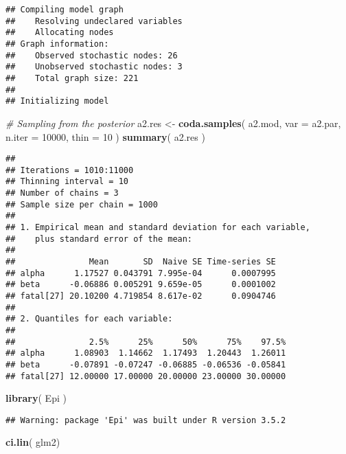 \documentclass[]{article}
\newenvironment{Shaded}{\begin{snugshade}}{\end{snugshade}}
\newcommand{\KeywordTok}[1]{\textcolor[rgb]{0.13,0.29,0.53}{\textbf{#1}}}
\newcommand{\DataTypeTok}[1]{\textcolor[rgb]{0.13,0.29,0.53}{#1}}
\newcommand{\DecValTok}[1]{\textcolor[rgb]{0.00,0.00,0.81}{#1}}
\newcommand{\StringTok}[1]{\textcolor[rgb]{0.31,0.60,0.02}{#1}}
\newcommand{\CommentTok}[1]{\textcolor[rgb]{0.56,0.35,0.01}{\textit{#1}}}
\newcommand{\NormalTok}[1]{#1}
\begin{document}
\begin{verbatim}
## Compiling model graph
##    Resolving undeclared variables
##    Allocating nodes
## Graph information:
##    Observed stochastic nodes: 26
##    Unobserved stochastic nodes: 3
##    Total graph size: 221
## 
## Initializing model
\end{verbatim}

\begin{Shaded}
\begin{Highlighting}[]
 \CommentTok{# Sampling from the posterior}
\NormalTok{ a2.res <-}\StringTok{ }\KeywordTok{coda.samples}\NormalTok{( a2.mod,}
 \DataTypeTok{var =}\NormalTok{ a2.par,}
 \DataTypeTok{n.iter =} \DecValTok{10000}\NormalTok{,}
 \DataTypeTok{thin =} \DecValTok{10}\NormalTok{ )}
 \KeywordTok{summary}\NormalTok{( a2.res )}
\end{Highlighting}
\end{Shaded}

\begin{verbatim}
## 
## Iterations = 1010:11000
## Thinning interval = 10 
## Number of chains = 3 
## Sample size per chain = 1000 
## 
## 1. Empirical mean and standard deviation for each variable,
##    plus standard error of the mean:
## 
##               Mean       SD  Naive SE Time-series SE
## alpha      1.17527 0.043791 7.995e-04      0.0007995
## beta      -0.06886 0.005291 9.659e-05      0.0001002
## fatal[27] 20.10200 4.719854 8.617e-02      0.0904746
## 
## 2. Quantiles for each variable:
## 
##               2.5%      25%      50%      75%    97.5%
## alpha      1.08903  1.14662  1.17493  1.20443  1.26011
## beta      -0.07891 -0.07247 -0.06885 -0.06536 -0.05841
## fatal[27] 12.00000 17.00000 20.00000 23.00000 30.00000
\end{verbatim}

\begin{Shaded}
\begin{Highlighting}[]
\KeywordTok{library}\NormalTok{( Epi )}
\end{Highlighting}
\end{Shaded}

\begin{verbatim}
## Warning: package 'Epi' was built under R version 3.5.2
\end{verbatim}

\begin{Shaded}
\begin{Highlighting}[]
\KeywordTok{ci.lin}\NormalTok{( glm2)}
\end{Highlighting}
\end{Shaded}
\end{document}
